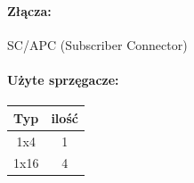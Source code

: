 	\paragraph{Złącza:}
		SC/APC (Subscriber Connector)
	\paragraph{Użyte sprzęgacze:}
		\begin{center}
			\begin{table}[htbp]
				\centering
				\begin{tabular}{|c|c|}
					\hline
					\textbf{Typ} & \textbf{ilość} \\ \hline
					1x4          & 1              \\ \hline
					1x16         & 4              \\ \hline
				\end{tabular}
			\end{table}
		\end{center}

